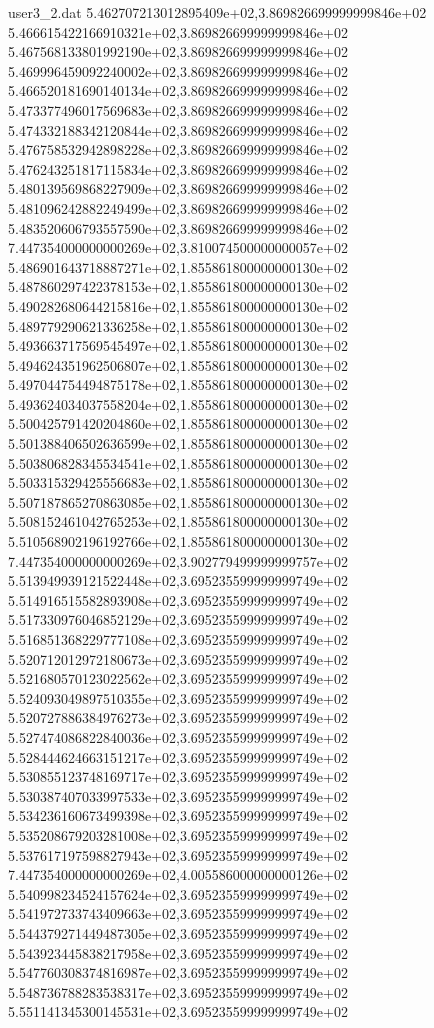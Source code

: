 \begin{filecontents}{user3_2.dat}
5.462707213012895409e+02,3.869826699999999846e+02
5.466615422166910321e+02,3.869826699999999846e+02
5.467568133801992190e+02,3.869826699999999846e+02
5.469996459092240002e+02,3.869826699999999846e+02
5.466520181690140134e+02,3.869826699999999846e+02
5.473377496017569683e+02,3.869826699999999846e+02
5.474332188342120844e+02,3.869826699999999846e+02
5.476758532942898228e+02,3.869826699999999846e+02
5.476243251817115834e+02,3.869826699999999846e+02
5.480139569868227909e+02,3.869826699999999846e+02
5.481096242882249499e+02,3.869826699999999846e+02
5.483520606793557590e+02,3.869826699999999846e+02
7.447354000000000269e+02,3.810074500000000057e+02
5.486901643718887271e+02,1.855861800000000130e+02
5.487860297422378153e+02,1.855861800000000130e+02
5.490282680644215816e+02,1.855861800000000130e+02
5.489779290621336258e+02,1.855861800000000130e+02
5.493663717569545497e+02,1.855861800000000130e+02
5.494624351962506807e+02,1.855861800000000130e+02
5.497044754494875178e+02,1.855861800000000130e+02
5.493624034037558204e+02,1.855861800000000130e+02
5.500425791420204860e+02,1.855861800000000130e+02
5.501388406502636599e+02,1.855861800000000130e+02
5.503806828345534541e+02,1.855861800000000130e+02
5.503315329425556683e+02,1.855861800000000130e+02
5.507187865270863085e+02,1.855861800000000130e+02
5.508152461042765253e+02,1.855861800000000130e+02
5.510568902196192766e+02,1.855861800000000130e+02
7.447354000000000269e+02,3.902779499999999757e+02
5.513949939121522448e+02,3.695235599999999749e+02
5.514916515582893908e+02,3.695235599999999749e+02
5.517330976046852129e+02,3.695235599999999749e+02
5.516851368229777108e+02,3.695235599999999749e+02
5.520712012972180673e+02,3.695235599999999749e+02
5.521680570123022562e+02,3.695235599999999749e+02
5.524093049897510355e+02,3.695235599999999749e+02
5.520727886384976273e+02,3.695235599999999749e+02
5.527474086822840036e+02,3.695235599999999749e+02
5.528444624663151217e+02,3.695235599999999749e+02
5.530855123748169717e+02,3.695235599999999749e+02
5.530387407033997533e+02,3.695235599999999749e+02
5.534236160673499398e+02,3.695235599999999749e+02
5.535208679203281008e+02,3.695235599999999749e+02
5.537617197598827943e+02,3.695235599999999749e+02
7.447354000000000269e+02,4.005586000000000126e+02
5.540998234524157624e+02,3.695235599999999749e+02
5.541972733743409663e+02,3.695235599999999749e+02
5.544379271449487305e+02,3.695235599999999749e+02
5.543923445838217958e+02,3.695235599999999749e+02
5.547760308374816987e+02,3.695235599999999749e+02
5.548736788283538317e+02,3.695235599999999749e+02
5.551141345300145531e+02,3.695235599999999749e+02

\end{filecontents}
